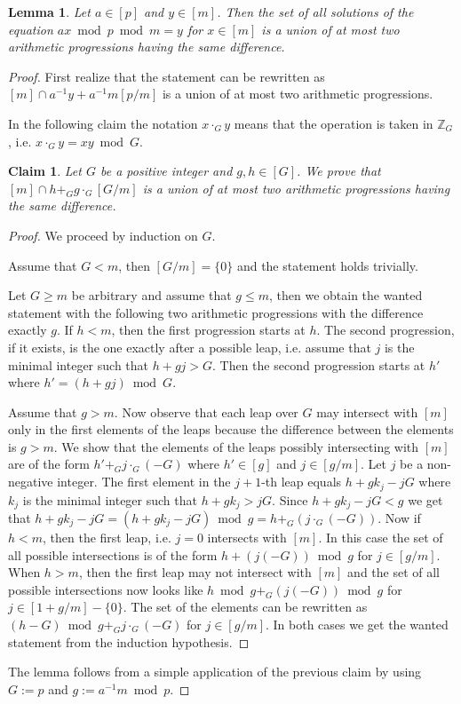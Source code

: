\documentclass{article}
\newtheorem{lemma}{Lemma}
\newtheorem{claim}{Claim}
\begin{document}
\begin{lemma}
\label{lemma-equation}
Let $a \in [p]$ and $y \in [m]$. Then the set of all solutions of the equation $ax \bmod p \bmod m = y$ for $x \in [m]$ is a union of at most two arithmetic progressions having the same difference.
\end{lemma}
\begin{proof}
First realize that the statement can be rewritten as $[m] \cap a^{-1}y + a^{-1}m [p/m]$ is a union of at most two arithmetic progressions.

In the following claim the notation $x \cdot_G y$ means that the operation is taken in $\mathbb{Z}_{G}$, i.e. $x \cdot_G y = xy \bmod G$. 
\begin{claim}
\label{claim:arithmetic-progression}
Let $G$ be a positive integer and $g, h \in [G]$. We prove that $[m] \cap h +_G g \cdot_{G} [G/m]$ is a union of at most two arithmetic progressions having the same difference.
\end{claim}
\begin{proof}
We proceed by induction on $G$.

Assume that $G < m$, then $[G/m] = \{0\}$ and the statement holds trivially.

Let $G \geq m$ be arbitrary and assume that $g \leq m$, then we obtain the wanted statement with the following two arithmetic progressions with the difference exactly $g$.
If $h < m$, then the first progression starts at $h$.
The second progression, if it exists, is the one exactly after a possible leap, i.e. assume that $j$ is the minimal integer such that $h + gj > G$. Then the second progression starts at $h'$ where $h' = (h + gj) \bmod G$.

Assume that $g > m$.
Now observe that each leap over $G$ may intersect with $[m]$ only in the first elements of the leaps because the difference between the elements is $g > m$.
We show that the elements of the leaps possibly intersecting with $[m]$ are of the form $h' +_{G} j\cdot_{G}(-G)$ where $h' \in [g]$ and $j \in [g/m]$.
Let $j$ be a non-negative integer.
The first element in the $j + 1$-th leap equals $h + gk_j - jG$ where $k_j$ is the minimal integer such that $h + gk_j > jG$.
Since $h + gk_j - jG < g$ we get that $h + gk_j - jG = (h + gk_j - jG) \bmod g = h +_{G} (j \cdot_{G}(-G))$.
Now if $h < m$, then the first leap, i.e. $j = 0$ intersects with $[m]$. 
In this case the set of all possible intersections is of the form $h + (j(-G)) \bmod g$ for $j \in [g/m]$.
When $h > m$, then the first leap may not intersect with $[m]$ and the set of all possible intersections now looks like $h \bmod g +_G (j(-G)) \bmod g$ for $j \in [1 + g/m ] - \{0\}$. The set of the elements can be rewritten as $(h - G) \bmod g +_G j\cdot_G(-G)$ for $j \in [g/m]$.
In both cases we get the wanted statement from the induction hypothesis.
\end{proof}

The lemma follows from a simple application of the previous claim by using $G := p$ and $g := a^{-1}m \bmod p$.
\end{proof}
\end{document}
